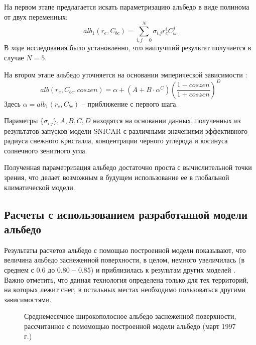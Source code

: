\documentclass[a4paper, fontsize=14pt]{scrartcl}
\begin{document}
На первом этапе предлагается искать параметризацию альбедо в виде полинома от двух переменных:
\begin{equation}
    alb_1(r_e, C_{bc}) = \sum_{i,j = 0}^N \sigma_{i.j} r_e^i C_{bc}^j   \label{sys}  
\end{equation}
В ходе исследования \cite{mipt2020} было установленно, что наилучший результат получается в случае $N = 5$.

На втором этапе альбедо уточняется на основании эмперической зависимости \cite{Saito2019}:
\begin{equation}
    alb(r_e, C_{bc}, coszen) = \alpha + (A + B \cdot \alpha^C) \left( \dfrac{1 - coszen}{1 + coszen} \right)^D     \label{sys}  
\end{equation}
Здесь $\alpha = alb_1(r_e, C_{bc})$ -- приближение с первого шага.

Параметры $\{ \sigma_{i.j} \}, A, B, C, D$ находятся на основании данных, полученных из результатов запусков модели SNICAR с различными значениями эффективного радиуса снежного кристалла, концентрации черного углерода и косинуса солнечного зенитного угла.

Полученная параметризация альбедо достаточно проста с вычислительной точки зрения, что делает возможным в будущем использование ее в глобальной климатической модели.

\subsection{Расчеты с использованием разработанной модели альбедо}

Результаты расчетов альбедо с помощью построенной модели показывают, что величина альбедо заснеженной поверхности, в целом, немного увеличилась (в среднем с $0.6$ до $0.80-0.85$) и приблизилась к результам других моделей \cite{Flanner2007, Gueymard2019}. Важно отметить, что данная технология определена только для тех территорий, на которых лежит снег, в остальных местах необходимо пользоваться другими зависимостями.

\begin{figure}[h]
    \caption{Среднемесячное широкополосное альбедо заснеженной поверхности, рассчитанное с помомощью построенной модели альбедо (март 1997 г.)}
    \label{fig:imageAlbOld}
\end{figure}
\end{document}
